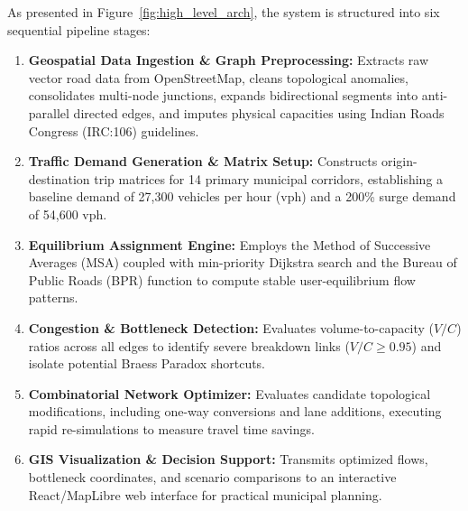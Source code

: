 \documentclass[12pt,a4paper]{report}
\begin{document}
As presented in Figure~\ref{fig:high_level_arch}, the system is structured into six sequential pipeline stages:
\begin{enumerate}
  \item \textbf{Geospatial Data Ingestion \& Graph Preprocessing:} Extracts raw vector road data from OpenStreetMap, cleans topological anomalies, consolidates multi-node junctions, expands bidirectional segments into anti-parallel directed edges, and imputes physical capacities using Indian Roads Congress (IRC:106) guidelines.
  \item \textbf{Traffic Demand Generation \& Matrix Setup:} Constructs origin-destination trip matrices for 14 primary municipal corridors, establishing a baseline demand of 27,300 vehicles per hour (vph) and a 200\% surge demand of 54,600 vph.
  \item \textbf{Equilibrium Assignment Engine:} Employs the Method of Successive Averages (MSA) coupled with min-priority Dijkstra search and the Bureau of Public Roads (BPR) function to compute stable user-equilibrium flow patterns.
  \item \textbf{Congestion \& Bottleneck Detection:} Evaluates volume-to-capacity ($V/C$) ratios across all edges to identify severe breakdown links ($V/C \ge 0.95$) and isolate potential Braess Paradox shortcuts.
  \item \textbf{Combinatorial Network Optimizer:} Evaluates candidate topological modifications, including one-way conversions and lane additions, executing rapid re-simulations to measure travel time savings.
  \item \textbf{GIS Visualization \& Decision Support:} Transmits optimized flows, bottleneck coordinates, and scenario comparisons to an interactive React/MapLibre web interface for practical municipal planning.
\end{enumerate}
\end{document}
